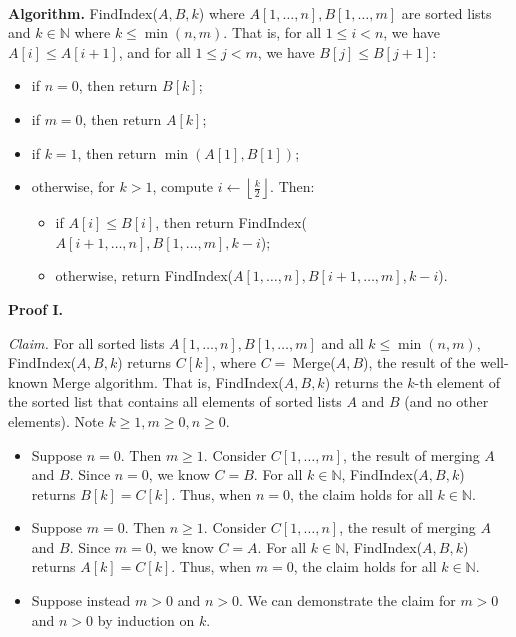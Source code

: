 \begin{solution}\\

\noindent\textbf{Algorithm. }{\sc FindIndex}($A,B,k$) where $A[1,\dots,n],B[1,\dots,m]$ are sorted lists and $k\in\mathbb{N}$ where $k\leq\min(n,m)$. That is, for all $1\leq i<n$, we have $A[i]\leq A[i+1]$, and for all $1\leq j<m$, we have $B[j]\leq B[j+1]$:
\begin{itemize}
\item if $n=0$, then return $B[k]$;
\item if $m=0$, then return $A[k]$;
\item if $k=1$, then return $\min(A[1],B[1])$;
\item otherwise, for $k>1$, compute $i\leftarrow\left\lfloor\frac{k}{2}\right\rfloor$. Then:
\begin{itemize}
\item if $A[i]\leq B[i]$, then return {\sc FindIndex}($A[i+1,\dots,n],B[1,\dots,m],k-i$);
\item otherwise, return {\sc FindIndex}($A[1,\dots,n],B[i+1,\dots,m],k-i$).
\end{itemize}
\end{itemize}

\noindent\textbf{Proof I.}

\noindent\textit{Claim. }For all sorted lists $A[1,\dots,n],B[1,\dots,m]$ and all $k\leq\min(n,m)$, {\sc FindIndex}($A,B,k$) returns $C[k]$, where $C=~${\sc Merge}($A,B$), the result of the well-known {\sc Merge} algorithm. That is, {\sc FindIndex}($A,B,k$) returns the $k$-th element of the sorted list that contains all elements of sorted lists $A$ and $B$ (and no other elements). Note $k\geq 1,m\geq 0,n\geq 0$.

\begin{itemize}
\item Suppose $n=0$. Then $m\geq 1$. Consider $C[1,\dots,m]$, the result of merging $A$ and $B$. Since $n=0$, we know $C=B$. For all $k\in\mathbb{N}$, {\sc FindIndex}($A,B,k$) returns $B[k]=C[k]$. Thus, when $n=0$, the claim holds for all $k\in\mathbb{N}$.
\item Suppose $m=0$. Then $n\geq 1$. Consider $C[1,\dots,n]$, the result of merging $A$ and $B$. Since $m=0$, we know $C=A$. For all $k\in\mathbb{N}$, {\sc FindIndex}($A,B,k$) returns $A[k]=C[k]$. Thus, when $m=0$, the claim holds for all $k\in\mathbb{N}$.
\item Suppose instead $m>0$ and $n>0$. We can demonstrate the claim for $m>0$ and $n>0$ by induction on $k$.\\


\end{itemize}
\end{solution}
